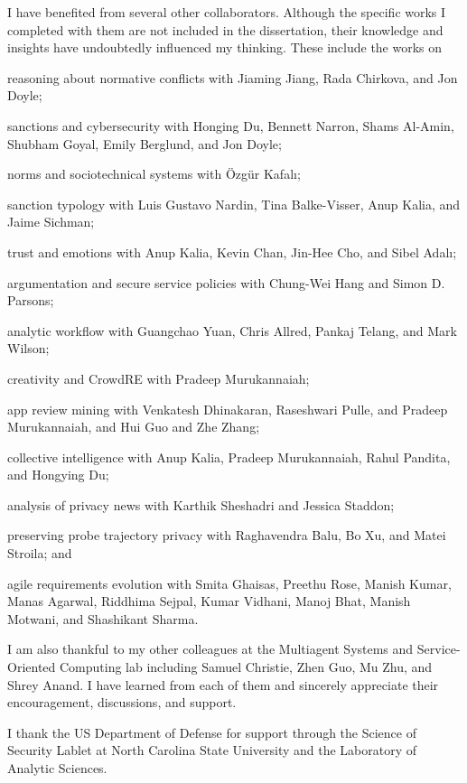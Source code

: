 \begin{acknowledgements}
I have benefited from several other collaborators. Although the
specific works I completed with them are not included in the
dissertation, their knowledge and insights have undoubtedly influenced
my thinking. These include the works on 
\begin{enumerate*}[label=(\arabic*)]
\item reasoning about normative conflicts with Jiaming Jiang, Rada Chirkova, and Jon Doyle; 
\item sanctions and cybersecurity with Honging Du, Bennett Narron, Shams Al-Amin, Shubham Goyal, Emily Berglund, and Jon Doyle; 
\item norms and sociotechnical systems with {\"O}zg{\"u}r
Kafal{\i}; 
\item sanction typology with Luis Gustavo Nardin, Tina Balke-Visser, Anup Kalia, and Jaime Sichman; 
\item trust and emotions with Anup Kalia, Kevin Chan, Jin-Hee Cho, and Sibel Adal{\i};
\item argumentation and secure service policies with Chung-Wei Hang and Simon D. Parsons; 
\item analytic workflow with Guangchao Yuan, Chris Allred, Pankaj Telang, and Mark Wilson; 
\item creativity and CrowdRE with Pradeep Murukannaiah;
\item app review mining with Venkatesh Dhinakaran, Raseshwari Pulle, and Pradeep Murukannaiah, and Hui Guo and Zhe Zhang;
\item collective intelligence with Anup Kalia, Pradeep Murukannaiah, Rahul Pandita, and Hongying Du;
\item analysis of privacy news with Karthik Sheshadri and Jessica Staddon;
\item preserving probe trajectory privacy with Raghavendra Balu, Bo Xu, and Matei Stroila; and
\item agile requirements evolution with Smita Ghaisas, Preethu Rose, Manish Kumar, Manas Agarwal, Riddhima Sejpal, Kumar Vidhani, Manoj Bhat, Manish Motwani, and Shashikant Sharma.
\end{enumerate*}

I am also thankful to my other colleagues at the Multiagent Systems and Service-Oriented Computing lab including Samuel Christie, Zhen Guo, Mu Zhu, and Shrey Anand. I have learned from each of them and sincerely appreciate their encouragement, discussions, and support. 

I thank the US Department of Defense for support through the
Science of Security Lablet at North Carolina State University and the Laboratory of Analytic Sciences.


\end{acknowledgements}
